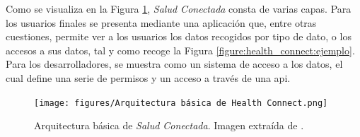         Como se visualiza en la Figura \ref{figure:health_connect:arquitectura}, \textit{Salud Conectada} consta de varias capas. Para los usuarios finales se presenta mediante una aplicación que, entre otras cuestiones, permite ver a los usuarios los datos recogidos por tipo de dato, o los accesos a sus datos, tal y como recoge la Figura \ref{figure:health_connect:ejemplo}. Para los desarrolladores, se muestra como un sistema de acceso a los datos, el cual define una serie de permisos y un acceso a través de una \gls{api}.

        \begin{figure}[h]
            \centering
            \texttt{[image: figures/Arquitectura básica de Health Connect.png]}
            \caption[Arquitectura básica de \textit{Salud Conectada}]
            {Arquitectura básica de \textit{Salud Conectada}. Imagen extraída de \cite{wilk_introducing_2022}.}
            \label{figure:health_connect:arquitectura}
        \end{figure}


